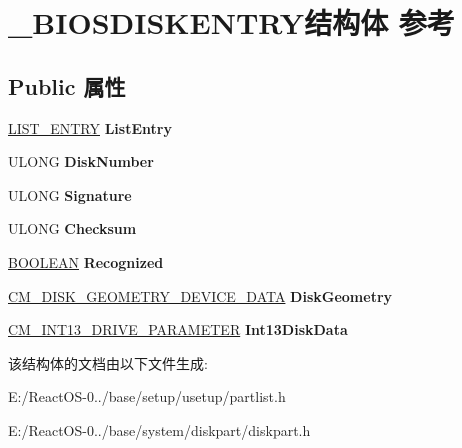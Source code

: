 \hypertarget{struct___b_i_o_s_d_i_s_k_e_n_t_r_y}{}\section{\+\_\+\+B\+I\+O\+S\+D\+I\+S\+K\+E\+N\+T\+R\+Y结构体 参考}
\label{struct___b_i_o_s_d_i_s_k_e_n_t_r_y}
\subsection*{Public 属性}
\begin{DoxyCompactItemize}
\item 
\mbox{\label{struct___b_i_o_s_d_i_s_k_e_n_t_r_y_a4acf2b730a5b9131e52049e3757b5db7}} 
\hyperlink{struct___l_i_s_t___e_n_t_r_y}{L\+I\+S\+T\+\_\+\+E\+N\+T\+RY} {\bfseries List\+Entry}
\item 
\mbox{\label{struct___b_i_o_s_d_i_s_k_e_n_t_r_y_a6d0c564fbbd5052533bef9393a1c547b}} 
U\+L\+O\+NG {\bfseries Disk\+Number}
\item 
\mbox{\label{struct___b_i_o_s_d_i_s_k_e_n_t_r_y_a9b0227fea2966ddff5c3aadcd15d2c60}} 
U\+L\+O\+NG {\bfseries Signature}
\item 
\mbox{\label{struct___b_i_o_s_d_i_s_k_e_n_t_r_y_a78610118d0547550d9c84c34ae4f4c72}} 
U\+L\+O\+NG {\bfseries Checksum}
\item 
\mbox{\label{struct___b_i_o_s_d_i_s_k_e_n_t_r_y_a2c626e0774e8de1a3a3cad29e26cc622}} 
\hyperlink{_processor_bind_8h_a112e3146cb38b6ee95e64d85842e380a}{B\+O\+O\+L\+E\+AN} {\bfseries Recognized}
\item 
\mbox{\label{struct___b_i_o_s_d_i_s_k_e_n_t_r_y_aa0a045a8f5c4ccdf3ca4fc31b8ca5bd4}} 
\hyperlink{struct___c_m___d_i_s_k___g_e_o_m_e_t_r_y___d_e_v_i_c_e___d_a_t_a}{C\+M\+\_\+\+D\+I\+S\+K\+\_\+\+G\+E\+O\+M\+E\+T\+R\+Y\+\_\+\+D\+E\+V\+I\+C\+E\+\_\+\+D\+A\+TA} {\bfseries Disk\+Geometry}
\item 
\mbox{\label{struct___b_i_o_s_d_i_s_k_e_n_t_r_y_aae41088fbdf69076497b8b2ae4b10b7e}} 
\hyperlink{struct___c_m___i_n_t13___d_r_i_v_e___p_a_r_a_m_e_t_e_r}{C\+M\+\_\+\+I\+N\+T13\+\_\+\+D\+R\+I\+V\+E\+\_\+\+P\+A\+R\+A\+M\+E\+T\+ER} {\bfseries Int13\+Disk\+Data}
\end{DoxyCompactItemize}


该结构体的文档由以下文件生成\+:\begin{DoxyCompactItemize}
\item 
E\+:/\+React\+O\+S-\/0../base/setup/usetup/partlist.\+h\item 
E\+:/\+React\+O\+S-\/0../base/system/diskpart/diskpart.\+h\end{DoxyCompactItemize}
